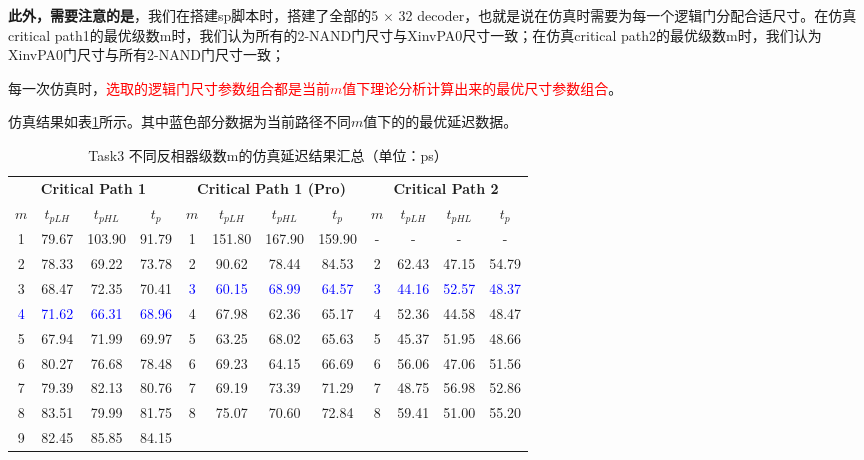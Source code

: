 \documentclass[UTF8,12pt,a4paper]{ctexart}
\begin{document}
\textbf{此外，需要注意的是}，我们在搭建sp脚本时，搭建了全部的5 $\times$ 32 decoder，也就是说在仿真时需要为每一个逻辑门分配合适尺寸。在仿真critical path1的最优级数m时，我们认为所有的2-NAND门尺寸与XinvPA0尺寸一致；在仿真critical path2的最优级数m时，我们认为XinvPA0门尺寸与所有2-NAND门尺寸一致；

每一次仿真时，\textcolor{red}{选取的逻辑门尺寸参数组合都是当前$m$值下理论分析计算出来的最优尺寸参数组合}。

仿真结果如表\ref{tab:task3_sim_m_all}所示。其中蓝色部分数据为当前路径不同$m$值下的的最优延迟数据。

\begin{table}[htbp]
    \centering
    \caption{Task3 不同反相器级数m的仿真延迟结果汇总（单位：ps）}
    \label{tab:task3_sim_m_all}
    \scriptsize %
    \setlength{\tabcolsep}{1.5pt} %
    \begin{tabular}{cccc|cccc|cccc}
    \toprule
    \multicolumn{4}{c|}{\textbf{Critical Path 1}} & \multicolumn{4}{c|}{\textbf{Critical Path 1 (Pro)}} & \multicolumn{4}{c}{\textbf{Critical Path 2}} \\
    $m$ & $t_{pLH}$ & $t_{pHL}$ & $t_p$ & $m$ & $t_{pLH}$ & $t_{pHL}$ & $t_p$ & $m$ & $t_{pLH}$ & $t_{pHL}$ & $t_p$ \\
    \midrule
    1 & 79.67 & 103.90 & 91.79 & 1 & 151.80 & 167.90 & 159.90 & - & - & - & - \\
    2 & 78.33 & 69.22 & 73.78 & 2 & 90.62 & 78.44 & 84.53 & 2 & 62.43 & 47.15 & 54.79 \\
    3 & 68.47 & 72.35 & 70.41 & \textcolor{blue}{3} & \textcolor{blue}{60.15} & \textcolor{blue}{68.99} & \textcolor{blue}{64.57} & \textcolor{blue}{3} & \textcolor{blue}{44.16} & \textcolor{blue}{52.57} & \textcolor{blue}{48.37} \\
    \textcolor{blue}{4} & \textcolor{blue}{71.62} & \textcolor{blue}{66.31} & \textcolor{blue}{68.96} & 4 & 67.98 & 62.36 & 65.17 & 4 & 52.36 & 44.58 & 48.47 \\
    5 & 67.94 & 71.99 & 69.97 & 5 & 63.25 & 68.02 & 65.63 & 5 & 45.37 & 51.95 & 48.66 \\
    6 & 80.27 & 76.68 & 78.48 & 6 & 69.23 & 64.15 & 66.69 & 6 & 56.06 & 47.06 & 51.56 \\
    7 & 79.39 & 82.13 & 80.76 & 7 & 69.19 & 73.39 & 71.29 & 7 & 48.75 & 56.98 & 52.86 \\
    8 & 83.51 & 79.99 & 81.75 & 8 & 75.07 & 70.60 & 72.84 & 8 & 59.41 & 51.00 & 55.20 \\
    9 & 82.45 & 85.85 & 84.15 & & & & & & & & \\
    \bottomrule
    \end{tabular}
\end{table}
\end{document}
